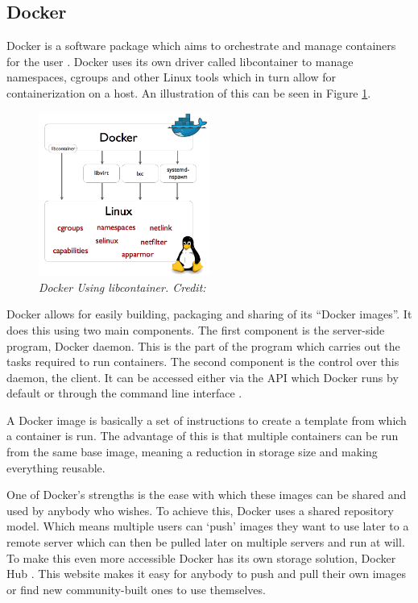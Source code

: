 \documentclass{article}
\begin{document}
\subsection{Docker}
\label{sub:Docker}
Docker is a software package which aims to orchestrate and manage containers for the user \citep{docker2016}. Docker uses its own driver called libcontainer to manage namespaces, cgroups and other Linux tools \citep{Hykes2014} which in turn allow for containerization on a host. An illustration of this can be seen in Figure \ref{fig:docker-driver}.

\begin{figure}[!h]
\centering
\includegraphics*[width=0.5\textwidth]{components/images/docker-driver}
\caption{\em Docker Using libcontainer. Credit: \citep{Hykes2014}}
\label{fig:docker-driver}
\end{figure}

Docker allows for easily building, packaging and sharing of its ``Docker images''. It does this using two main components. The first component is the server-side program, Docker daemon. This is the part of the program which carries out the tasks required to run containers. The second component is the control over this daemon, the client. It can be accessed either via the API which Docker runs by default or through the command line interface \citep{Engine2016}.

A Docker image is basically a set of instructions to create a template from which a container is run. The advantage of this is that multiple containers can be run from the same base image, meaning a reduction in storage size and making everything reusable. 

One of Docker's strengths is the ease with which these images can be shared and used by anybody who wishes. To achieve this, Docker uses a shared repository model. Which means multiple users can `push' images they want to use later to a remote server which can then be pulled later on multiple servers and run at will. To make this even more accessible Docker has its own storage solution, Docker Hub \citep{Hub2016}. This website makes it easy for anybody to push and pull their own images or find new community-built ones to use themselves.
\end{document}
